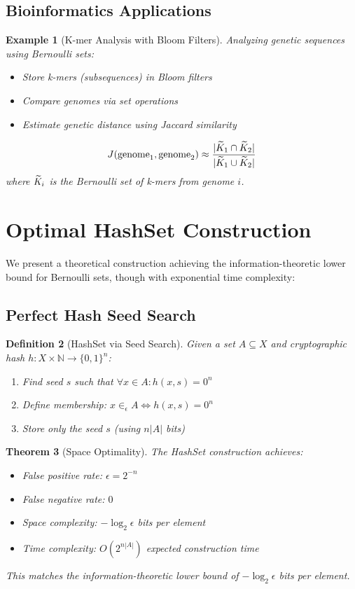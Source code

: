 \documentclass[11pt,final,hidelinks]{article}
\newtheorem{theorem}{Theorem}[section]
\newtheorem{definition}[theorem]{Definition}
\newtheorem{example}[theorem]{Example}
\newcommand{\ASet}[1]{\obs{#1}}  %
\begin{document}
\subsection{Bioinformatics Applications}

\begin{example}[K-mer Analysis with Bloom Filters]
Analyzing genetic sequences using Bernoulli sets:
\begin{itemize}
    \item Store k-mers (subsequences) in Bloom filters
    \item Compare genomes via set operations
    \item Estimate genetic distance using Jaccard similarity
\end{itemize}

\begin{equation}
J(\text{genome}_1, \text{genome}_2) \approx \frac{\Card{\ASet{K}_1 \cap \ASet{K}_2}}{\Card{\ASet{K}_1 \cup \ASet{K}_2}}
\end{equation}
where $\ASet{K}_i$ is the Bernoulli set of k-mers from genome $i$.
\end{example}

\section{Optimal HashSet Construction}

We present a theoretical construction achieving the information-theoretic lower bound for Bernoulli sets, though with exponential time complexity:

\subsection{Perfect Hash Seed Search}

\begin{definition}[HashSet via Seed Search]
Given a set $A \subseteq X$ and cryptographic hash $h : X \times \mathbb{N} \to \{0,1\}^n$:
\begin{enumerate}
    \item Find seed $s$ such that $\forall x \in A: h(x, s) = 0^n$
    \item Define membership: $x \in_\epsilon A \iff h(x, s) = 0^n$
    \item Store only the seed $s$ (using $n|A|$ bits)
\end{enumerate}
\end{definition}

\begin{theorem}[Space Optimality]
The HashSet construction achieves:
\begin{itemize}
    \item False positive rate: $\epsilon = 2^{-n}$
    \item False negative rate: $0$
    \item Space complexity: $-\log_2 \epsilon$ bits per element
    \item Time complexity: $O(2^{n|A|})$ expected construction time
\end{itemize}
This matches the information-theoretic lower bound of $-\log_2 \epsilon$ bits per element.
\end{theorem}
\end{document}
